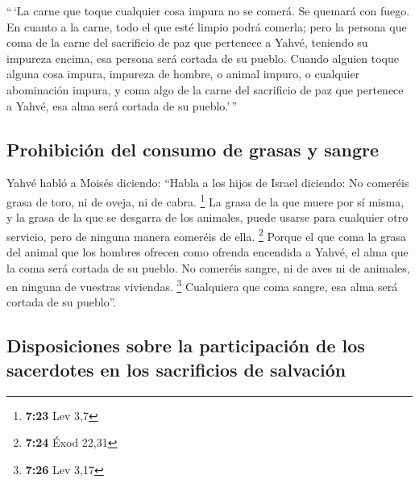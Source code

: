 \begin{paracol}{2}
 ``\,`La carne que toque cualquier cosa impura no se
comerá. Se quemará con fuego. En cuanto a la carne, todo el que esté
limpio podrá comerla;  pero la persona que coma de la
carne del sacrificio de paz que pertenece a Yahvé, teniendo su impureza
encima, esa persona será cortada de su pueblo.  Cuando
alguien toque alguna cosa impura, impureza de hombre, o animal impuro, o
cualquier abominación impura, y coma algo de la carne del sacrificio de
paz que pertenece a Yahvé, esa alma será cortada de su pueblo.'\,''

\hypertarget{prohibiciuxf3n-del-consumo-de-grasas-y-sangre}{%
\subsection{Prohibición del consumo de grasas y
sangre}\label{prohibiciuxf3n-del-consumo-de-grasas-y-sangre}}

 Yahvé habló a Moisés diciendo:  ``Habla a
los hijos de Israel diciendo: No comeréis grasa de toro, ni de oveja, ni
de cabra. \footnote{\textbf{7:23} Lev 3,7}  La grasa de
la que muere por sí misma, y la grasa de la que se desgarra de los
animales, puede usarse para cualquier otro servicio, pero de ninguna
manera comeréis de ella. \footnote{\textbf{7:24} Éxod 22,31}
 Porque el que coma la grasa del animal que los hombres
ofrecen como ofrenda encendida a Yahvé, el alma que la coma será cortada
de su pueblo.  No comeréis sangre, ni de aves ni de
animales, en ninguna de vuestras viviendas. \footnote{\textbf{7:26} Lev
  3,17}  Cualquiera que coma sangre, esa alma será
cortada de su pueblo''.

\hypertarget{disposiciones-sobre-la-participaciuxf3n-de-los-sacerdotes-en-los-sacrificios-de-salvaciuxf3n}{%
\subsection{Disposiciones sobre la participación de los sacerdotes en
los sacrificios de
salvación}\label{disposiciones-sobre-la-participaciuxf3n-de-los-sacerdotes-en-los-sacrificios-de-salvaciuxf3n}}


\end{paracol}
